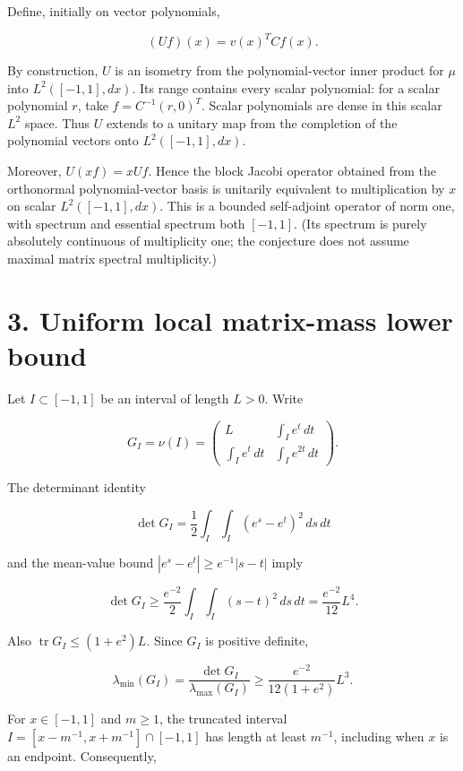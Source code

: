 \documentclass[11pt,a4paper]{article}
\begin{document}
Define, initially on vector polynomials,

\[
(Uf)(x)=v(x)^T C f(x).
\]

By construction, \(U\) is an isometry from the polynomial-vector inner
product for \(\mu\) into \(L^2([-1,1],dx)\). Its range contains every
scalar polynomial: for a scalar polynomial \(r\), take
\(f=C^{-1}(r,0)^T\). Scalar polynomials are dense in this scalar \(L^2\)
space. Thus \(U\) extends to a unitary map from the completion of the
polynomial vectors onto \(L^2([-1,1],dx)\).

Moreover, \(U(xf)=xUf\). Hence the block Jacobi operator obtained from
the orthonormal polynomial-vector basis is unitarily equivalent to
multiplication by \(x\) on scalar \(L^2([-1,1],dx)\). This is a bounded
self-adjoint operator of norm one, with spectrum and essential spectrum
both \([-1,1]\). (Its spectrum is purely absolutely continuous of
multiplicity one; the conjecture does not assume maximal matrix spectral
multiplicity.)

\hypertarget{1035-uniform-local-matrix-mass-lower-bound}{%
\section{3. Uniform local matrix-mass lower
bound}\label{1035-uniform-local-matrix-mass-lower-bound}}

Let \(I\subset[-1,1]\) be an interval of length \(L>0\). Write

\[
G_I=\nu(I)=\begin{pmatrix}
L&\int_I e^t\,dt\\
\int_I e^t\,dt&\int_I e^{2t}\,dt
\end{pmatrix}.
\]

The determinant identity

\[
\det G_I
=\frac12\int_I\int_I(e^s-e^t)^2\,ds\,dt
\]

and the mean-value bound \(|e^s-e^t|\ge e^{-1}|s-t|\) imply

\[
\det G_I\ge\frac{e^{-2}}2\int_I\int_I(s-t)^2\,ds\,dt
=\frac{e^{-2}}{12}L^4.
\]

Also \(\operatorname{tr}G_I\le(1+e^2)L\). Since \(G_I\) is positive
definite,

\[
\lambda_{\min}(G_I)
=\frac{\det G_I}{\lambda_{\max}(G_I)}
\ge\frac{e^{-2}}{12(1+e^2)}L^3.
\]

For \(x\in[-1,1]\) and \(m\ge1\), the truncated interval
\(I=[x-m^{-1},x+m^{-1}]\cap[-1,1]\) has length at least \(m^{-1}\),
including when \(x\) is an endpoint. Consequently,
\end{document}

